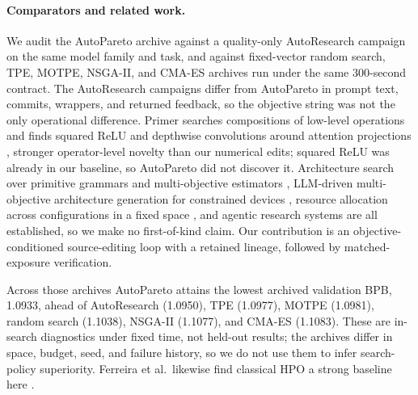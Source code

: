 \documentclass{article}
\begin{document}
\paragraph{Comparators and related work.} We audit the AutoPareto archive against a quality-only AutoResearch campaign on the same model family and task, and against fixed-vector random search, TPE, MOTPE, NSGA-II, and CMA-ES archives run under the same 300-second contract. The AutoResearch campaigns differ from AutoPareto in prompt text, commits, wrappers, and returned feedback, so the objective string was not the only operational difference. Primer searches compositions of low-level operations and finds squared ReLU and depthwise convolutions around attention projections \citep{primer}, stronger operator-level novelty than our numerical edits; squared ReLU was already in our baseline, so AutoPareto did not discover it. Architecture search over primitive grammars and multi-objective estimators \citep{einspace,mote}, LLM-driven multi-objective architecture generation for constrained devices \citep{monaq}, resource allocation across configurations in a fixed space \citep{hyperband,bohb}, and agentic research systems \citep{autodiscovery,mlestar,airesearcher,mledojo} are all established, so we make no first-of-kind claim. Our contribution is an objective-conditioned source-editing loop with a retained lineage, followed by matched-exposure verification.

Across those archives AutoPareto attains the lowest archived validation BPB, 1.0933, ahead of AutoResearch (1.0950), TPE (1.0977), MOTPE (1.0981), random search (1.1038), NSGA-II (1.1077), and CMA-ES (1.1083). These are in-search diagnostics under fixed time, not held-out results; the archives differ in space, budget, seed, and failure history, so we do not use them to infer search-policy superiority. Ferreira et al.\ likewise find classical HPO a strong baseline here \citep{ferreira}.
\end{document}
